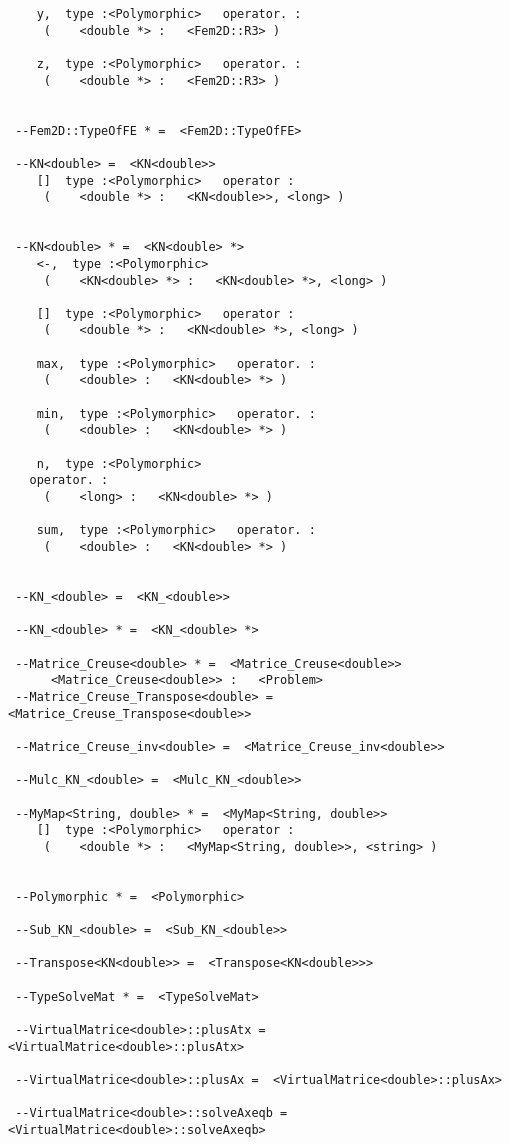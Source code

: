 \documentclass[twoside]{book}
\begin{document}
\begin{verbatim}
    y,  type :<Polymorphic>   operator. : 
	 (	  <double *> :   <Fem2D::R3> )

    z,  type :<Polymorphic>   operator. : 
	 (	  <double *> :   <Fem2D::R3> )


 --Fem2D::TypeOfFE * =  <Fem2D::TypeOfFE>

 --KN<double> =  <KN<double>>
    []  type :<Polymorphic>   operator : 
	 (	  <double *> :   <KN<double>>, <long> )


 --KN<double> * =  <KN<double> *>
    <-,  type :<Polymorphic>   
	 (	  <KN<double> *> :   <KN<double> *>, <long> )

    []  type :<Polymorphic>   operator : 
	 (	  <double *> :   <KN<double> *>, <long> )

    max,  type :<Polymorphic>   operator. : 
	 (	  <double> :   <KN<double> *> )

    min,  type :<Polymorphic>   operator. : 
	 (	  <double> :   <KN<double> *> )

    n,  type :<Polymorphic>
   operator. : 
	 (	  <long> :   <KN<double> *> )

    sum,  type :<Polymorphic>   operator. : 
	 (	  <double> :   <KN<double> *> )


 --KN_<double> =  <KN_<double>>

 --KN_<double> * =  <KN_<double> *>

 --Matrice_Creuse<double> * =  <Matrice_Creuse<double>>
	  <Matrice_Creuse<double>> :   <Problem> 
 --Matrice_Creuse_Transpose<double> =  <Matrice_Creuse_Transpose<double>>

 --Matrice_Creuse_inv<double> =  <Matrice_Creuse_inv<double>>

 --Mulc_KN_<double> =  <Mulc_KN_<double>>

 --MyMap<String, double> * =  <MyMap<String, double>>
    []  type :<Polymorphic>   operator : 
	 (	  <double *> :   <MyMap<String, double>>, <string> )


 --Polymorphic * =  <Polymorphic>

 --Sub_KN_<double> =  <Sub_KN_<double>>

 --Transpose<KN<double>> =  <Transpose<KN<double>>>

 --TypeSolveMat * =  <TypeSolveMat>

 --VirtualMatrice<double>::plusAtx =  <VirtualMatrice<double>::plusAtx>

 --VirtualMatrice<double>::plusAx =  <VirtualMatrice<double>::plusAx>

 --VirtualMatrice<double>::solveAxeqb =  <VirtualMatrice<double>::solveAxeqb>


\end{verbatim}
\end{document}
